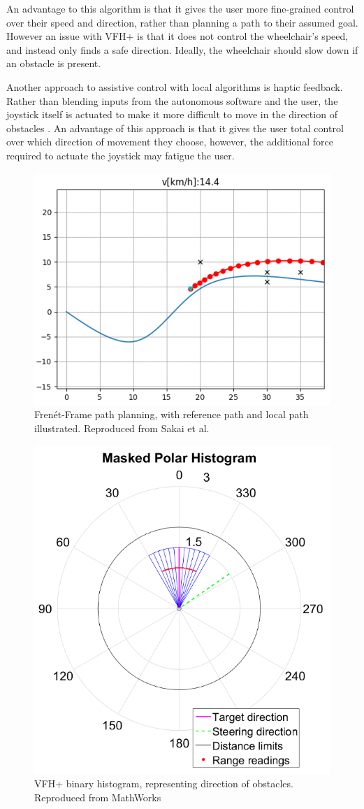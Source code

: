 An advantage to this algorithm is that it gives the user more fine-grained control over their speed and direction,
rather than planning a path to their assumed goal.
However an issue with VFH+ is that it does not control the wheelchair's speed, and instead only finds a safe direction.
Ideally, the wheelchair should slow down if an obstacle is present.

Another approach to assistive control with local algorithms is haptic feedback. Rather than
blending inputs from the autonomous software and the user, the joystick itself is actuated
to make it more difficult to move in the direction of obstacles \cite{kondoNavigationGuidanceControl2008}\cite{vanderpoortenPoweredWheelchairNavigation2012}.
An advantage of this approach is that it gives the user total control over which direction of movement they choose,
however, the additional force required to actuate the joystick may fatigue the user.

\begin{figure}[H]
    \centering
    \includegraphics[width=0.5\linewidth]{images/frenet_frame_local_path.png}
    \caption{Fren\'et-Frame path planning, with reference path and local path illustrated. Reproduced from Sakai et al. \cite{sakaiPythonRoboticsPythonCode2018}}
    \label{fig:frenet_frame_local_path}
\end{figure}

\begin{figure}[H]
    \centering
    \includegraphics[width=0.35\linewidth]{images/binary_histogram_vfh.png}
    \caption{VFH+ binary histogram, representing direction of obstacles. Reproduced from MathWorks \cite{mathworksVectorFieldHistogram2022}}
    \label{fig:binary_histogram_vfh}
\end{figure}

